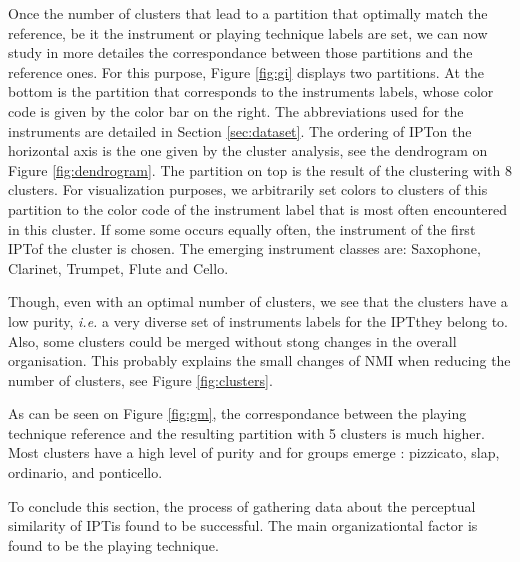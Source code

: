\documentclass{article}
\newcommand{\ipt}{IPT}
\begin{document}
Once the number of clusters that lead to a partition that optimally match the reference, be it the instrument or playing technique labels are set, we can now study in more detailes the correspondance between those partitions and the reference ones. For this purpose, Figure \ref{fig:gi} displays two partitions. At the bottom is the partition that corresponds to the instruments labels, whose color code is given by the color bar on the right. The abbreviations used for the instruments are detailed in Section \ref{sec:dataset}. The ordering of \ipt on the horizontal axis is the one given by the cluster analysis, see the dendrogram on Figure \ref{fig:dendrogram}. The partition on top is the result of the clustering with 8 clusters. For visualization purposes, we arbitrarily set colors to clusters of this partition to the color code of the instrument label that is most often encountered in this cluster. If some some occurs equally often, the instrument of the first \ipt of the cluster is chosen. The emerging instrument classes are: Saxophone, Clarinet, Trumpet, Flute and Cello.

Though, even with an optimal number of clusters, we see that the clusters have  a low purity, \textit{i.e.} a very diverse set of instruments labels for the \ipt they belong to. Also, some clusters could be merged without stong changes in the overall organisation. This probably explains the small changes of NMI when reducing the number of clusters, see Figure \ref{fig:clusters}.

As can be seen on Figure \ref{fig:gm}, the correspondance between the playing technique reference and the resulting partition with 5 clusters is much higher. Most clusters have a high level of purity and for groups emerge : pizzicato, slap, ordinario, and ponticello.

To conclude this section, the process of gathering data about the perceptual similarity of \ipt is found to be successful. The main organizationtal factor is found to be the playing technique.
\end{document}
